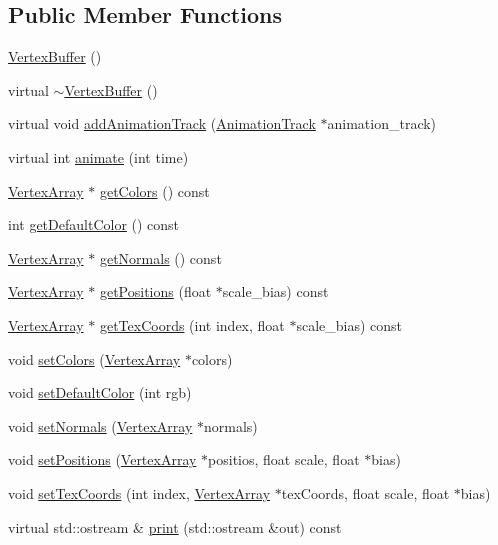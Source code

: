 \subsection*{Public Member Functions}
\begin{CompactItemize}
\item 
\hyperlink{classm3g_1_1VertexBuffer_fd7b13840c99c57d27316c8f8434dc49}{VertexBuffer} ()
\item 
virtual \hyperlink{classm3g_1_1VertexBuffer_0e5e1dbdc4295ff9aa1e15e0ce3624af}{$\sim$VertexBuffer} ()
\item 
virtual void \hyperlink{classm3g_1_1VertexBuffer_415c0b110f95410ded9b85e5d99a496b}{addAnimationTrack} (\hyperlink{classm3g_1_1AnimationTrack}{AnimationTrack} $\ast$animation\_\-track)
\item 
virtual int \hyperlink{classm3g_1_1VertexBuffer_82cfeb67ca66b93e2ca7bda9a4f0e2aa}{animate} (int time)
\item 
\hyperlink{classm3g_1_1VertexArray}{VertexArray} $\ast$ \hyperlink{classm3g_1_1VertexBuffer_e3bdc8503242a6d278230352d03e5893}{getColors} () const 
\item 
int \hyperlink{classm3g_1_1VertexBuffer_4e33b93a98ce0632d51e7ae775ae5b1e}{getDefaultColor} () const 
\item 
\hyperlink{classm3g_1_1VertexArray}{VertexArray} $\ast$ \hyperlink{classm3g_1_1VertexBuffer_0f4341d1215ff8f4efeaa40a21327c0c}{getNormals} () const 
\item 
\hyperlink{classm3g_1_1VertexArray}{VertexArray} $\ast$ \hyperlink{classm3g_1_1VertexBuffer_5ca059361f9f834dd00b5d595bf3df0b}{getPositions} (float $\ast$scale\_\-bias) const 
\item 
\hyperlink{classm3g_1_1VertexArray}{VertexArray} $\ast$ \hyperlink{classm3g_1_1VertexBuffer_9015840c09da0691c31a8aab5e09404a}{getTexCoords} (int index, float $\ast$scale\_\-bias) const 
\item 
void \hyperlink{classm3g_1_1VertexBuffer_e5a5933252e3ec3afa0a83698b5b3521}{setColors} (\hyperlink{classm3g_1_1VertexArray}{VertexArray} $\ast$colors)
\item 
void \hyperlink{classm3g_1_1VertexBuffer_ba88996ea63221b09b9f841aef0270ee}{setDefaultColor} (int rgb)
\item 
void \hyperlink{classm3g_1_1VertexBuffer_4aabe6277538d5aa8285759dab85002a}{setNormals} (\hyperlink{classm3g_1_1VertexArray}{VertexArray} $\ast$normals)
\item 
void \hyperlink{classm3g_1_1VertexBuffer_527460407f488d5128bae7d0adb6da43}{setPositions} (\hyperlink{classm3g_1_1VertexArray}{VertexArray} $\ast$positios, float scale, float $\ast$bias)
\item 
void \hyperlink{classm3g_1_1VertexBuffer_626af19bd7702480ac9e8ea4532d27d5}{setTexCoords} (int index, \hyperlink{classm3g_1_1VertexArray}{VertexArray} $\ast$texCoords, float scale, float $\ast$bias)
\item 
virtual std::ostream \& \hyperlink{classm3g_1_1VertexBuffer_6fea17fa1532df3794f8cb39cb4f911f}{print} (std::ostream \&out) const 
\end{CompactItemize}
